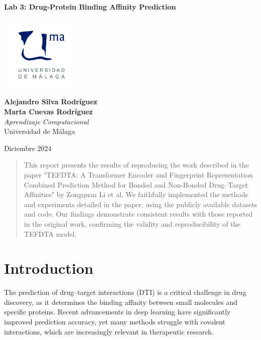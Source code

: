 \documentclass{article}
\begin{document}
\begin{titlepage}
	\centering
	\vspace*{3cm}
	
	{\Huge \textbf{Lab 3: Drug-Protein Binding Affinity Prediction}\\[0.5cm]}
	
	\vspace{2cm}
	\includegraphics[width=0.3\textwidth]{images/uma_logo.jpg}\\[1cm]
	
	{\LARGE \textbf{Alejandro Silva Rodríguez}\\[0.5cm]}
	{\LARGE \textbf{Marta Cuevas Rodríguez}\\[0.5cm]}
	{\large \textit{Aprendizaje Computacional}\\
		Universidad de Málaga\\
		}
	
	\vfill
	
	{\large Diciembre 2024}
\end{titlepage}

\tableofcontents

\newpage

\begin{abstract}
	This report presents the results of reproducing the work described in the paper "TEFDTA: A Transformer Encoder and Fingerprint Representation Combined Prediction Method for Bonded and Non-Bonded Drug–Target Affinities" by Zongquan Li et al. We faithfully \cite{lizongquan2024tefdta} implemented the methods and experiments detailed in the paper, using the publicly available datasets and code. Our findings demonstrate consistent results with those reported in the original work, confirming the validity and reproducibility of the TEFDTA model. 
\end{abstract}

\section{Introduction}
The prediction of drug–target interactions (DTI) is a critical challenge in drug discovery, as it determines the binding affinity between small molecules and specific proteins. Recent advancements in deep learning have significantly improved prediction accuracy, yet many methods struggle with covalent interactions, which are increasingly relevant in therapeutic research.
\\
\end{document}
